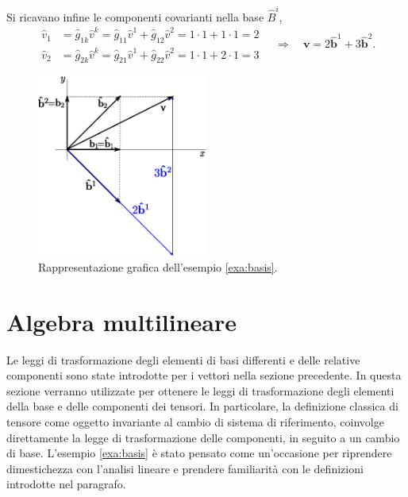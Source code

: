 Si ricavano infine le componenti covarianti nella base $\hat{B}^i$,
\begin{equation}
\begin{aligned}
 \hat{v}_1 & = \hat{g}_{1k} \hat{v}^k = 
   \hat{g}_{11} \hat{v}^1 + \hat{g}_{12} \hat{v}^2 = 
   1 \cdot 1 + 1 \cdot 1 = 2 \\
 \hat{v}_2 & = \hat{g}_{2k} \hat{v}^k = 
   \hat{g}_{21} \hat{v}^1 + \hat{g}_{22} \hat{v}^2 = 
   1 \cdot 1 + 2 \cdot 1 = 3 
\end{aligned}
\quad \Rightarrow \quad 
 \bm{v} = 2 \bm{\hat{b}}^1 + 3 \bm{\hat{b}}^2 .
\end{equation}
%
\begin{figure}[h]
\centering
   \includegraphics[width=0.50\textwidth]{./fig/ese_basis2.eps}
 \caption{Rappresentazione grafica dell'esempio \ref{exa:basis}.}
\end{figure}
%


\newpage

\section{Algebra multilineare}
Le leggi di trasformazione degli elementi di basi differenti e delle relative componenti sono state introdotte per i vettori nella sezione precedente. In questa sezione verranno utilizzate per ottenere le leggi di trasformazione degli elementi della base e delle componenti dei tensori. In particolare, la definizione classica di tensore come oggetto invariante al cambio di sistema di riferimento, coinvolge direttamente la legge di trasformazione delle componenti, in seguito a un cambio di base. L'esempio \ref{exa:basis} è stato pensato come un'occasione per riprendere dimestichezza con l'analisi lineare e prendere familiarità con le definizioni introdotte nel paragrafo.

